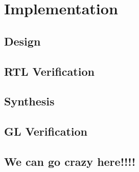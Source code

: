 \newpage
\thispagestyle{fancy}

\section{Implementation}

\subsection{Design}

\subsection{RTL Verification}

\subsection{Synthesis}

\subsection{GL Verification}

\subsection{We can go crazy here!!!!}
